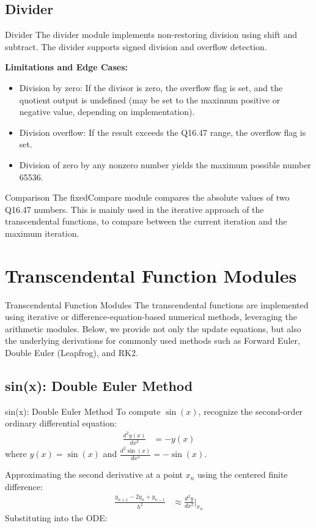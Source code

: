 \documentclass{beamer}
\theoremstyle{remark}
\begin{document}
\subsection{Divider}
\begin{frame}{Divider}
   The divider module implements non-restoring division using shift and subtract.
The divider supports signed division and overflow detection.

\textbf{Limitations and Edge Cases:}
\begin{itemize}
    \item Division by zero: If the divisor is zero, the overflow flag is set, and the quotient output is undefined (may be set to the maximum positive or negative value, depending on implementation).
    \item Division overflow: If the result exceeds the Q16.47 range, the overflow flag is set.
    \item Division of zero by any nonzero number yields the maximum possible number 65536.
\end{itemize}
\end{frame}

\begin{frame}{Comparison}
The fixedCompare module compares the absolute values of two Q16.47 numbers. This is mainly used in the iterative approach of the transcendental functions, to compare between the current iteration and the maximum iteration.
\end{frame}

\section{Transcendental Function Modules}
\begin{frame}{Transcendental Function Modules}
    The transcendental functions are implemented using iterative or difference-equation-based numerical methods, leveraging the arithmetic modules. Below, we provide not only the update equations, but also the underlying derivations for commonly used methods such as Forward Euler, Double Euler (Leapfrog), and RK2.
\end{frame}

\subsection{sin(x): Double Euler Method}
\begin{frame}{sin(x): Double Euler Method}
    To compute \(\sin(x)\), recognize the second-order ordinary differential equation:
\begin{align*}
	\frac{d^2 y(x)}{dx^2} &= -y(x)
\end{align*}
where \(y(x) = \sin(x)\) and \(\frac{d^2 \sin(x)}{dx^2} = -\sin(x)\).

Approximating the second derivative at a point \(x_n\) using the centered finite difference:
\begin{align*}
	\frac{y_{n+1} - 2y_n + y_{n-1}}{h^2} &\approx \frac{d^2 y}{dx^2}\bigg|_{x_n} 
\end{align*}
Substituting into the ODE:
\end{frame}
\end{document}
